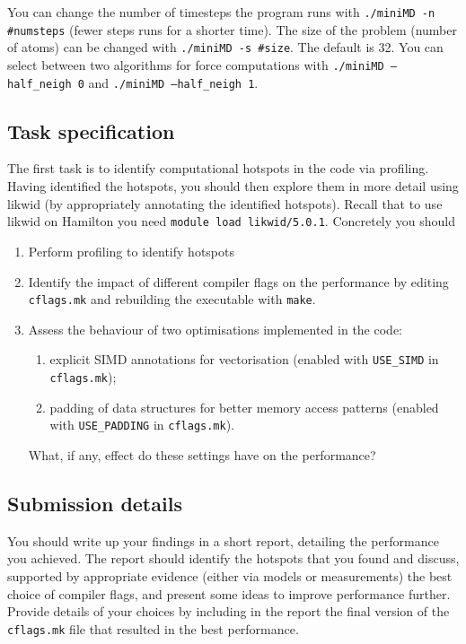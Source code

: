 \documentclass[a4paper]{article}
\begin{document}
You can change the number of timesteps the program runs with
\texttt{./miniMD -n \#numsteps} (fewer steps runs for a shorter time).
The size of the problem (number of atoms) can be changed with
\texttt{./miniMD -s \#size}. The default is 32.
You can select between two algorithms for force computations with
\texttt{./miniMD --half\_neigh 0} and \texttt{./miniMD --half\_neigh 1}.

\subsection{Task specification}
\label{sec:task}
The first task is to identify computational hotspots in the code via
profiling. Having identified the hotspots, you should then explore
them in more detail using likwid (by appropriately annotating the
identified hotspots). Recall that to use likwid on Hamilton you need
\texttt{module load likwid/5.0.1}.
Concretely you should
\begin{enumerate}
\item Perform profiling to identify hotspots
\item Identify the impact of different compiler flags on the performance by editing \texttt{cflags.mk}
and rebuilding the executable with \texttt{make}.
\item Assess the behaviour of two optimisations implemented in the
  code:
  \begin{enumerate}[label=\roman*.]
  \item explicit SIMD annotations for vectorisation (enabled with
    \texttt{USE\_SIMD} in \texttt{cflags.mk});
  \item padding of data structures for better memory access patterns
    (enabled with \texttt{USE\_PADDING} in \texttt{cflags.mk}).
  \end{enumerate}
  What, if any, effect do these settings have on the performance?
\end{enumerate}

\subsection{Submission details}
\label{sec:submission}

You should write up your findings in a short report, detailing the
performance you achieved. The report should identify the hotspots that
you found and discuss, supported by appropriate evidence (either via
models or measurements) the best choice of compiler flags, and present
some ideas to improve performance further. Provide details of your
choices by including in the report the final version of the
\texttt{cflags.mk} file that resulted in the best performance.
\end{document}
